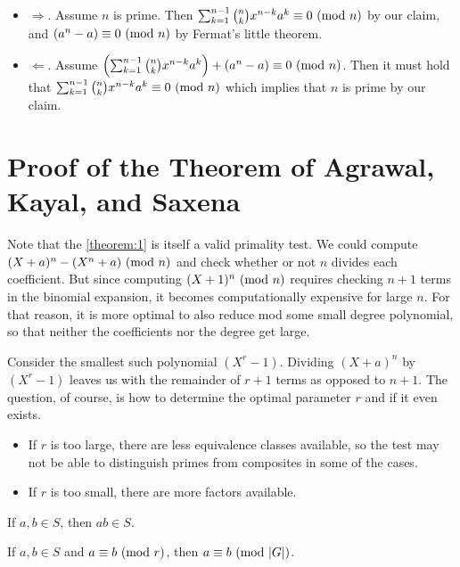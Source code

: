 \begin{itemize}
    \item $\Longrightarrow$. Assume $n$ is prime. Then $\sum_{k=1}^{n-1} \binom{n}{k}x^{n-k}a^k\equiv0\ (\mathrm{mod}\ n)$ by our claim, and $(a^n-a)\equiv 0 \ (\mathrm{mod}\ n)$ by Fermat's little theorem. 
    \item $\Longleftarrow$. Assume $\left(\sum_{k=1}^{n-1} \binom{n}{k}x^{n-k}a^k\right) + (a^n-a)\equiv 0 \ (\mathrm{mod}\ n)$. Then it must hold that $\sum_{k=1}^{n-1} \binom{n}{k}x^{n-k}a^k\equiv 0 \ (\mathrm{mod}\ n)$ which implies that $n$ is prime by our claim.
\end{itemize}

\section{Proof of the Theorem of Agrawal, Kayal, and Saxena}

Note that the \ref{theorem:1} is itself a valid primality test. We could compute $(X + a)^{n} - (X^{n} + a) \ (\mathrm{mod}\ n)$ and check whether or not $n$ divides each coefficient. But since computing $(X + 1)^{n} \ (\mathrm{mod}\ n)$ requires checking $n+1$ terms in the binomial expansion, it becomes computationally expensive for large $n$. For that reason, it is more optimal to also reduce mod some small degree polynomial, so that neither the coefficients nor the degree get large.

Consider the smallest such polynomial $(X^{r} - 1)$. Dividing $(X + a)^{n}$ by $(X^{r} - 1)$ leaves us with the remainder of $r + 1$ terms as opposed to $n + 1$. The question, of course, is how to determine the optimal parameter $r$ and if it even exists.

\begin{itemize}
    \item If $r$ is too large, there are less equivalence classes available, so the test may not be able to distinguish primes from composites in some of the cases.
    \item If $r$ is too small, there are more factors available.
\end{itemize}

\begin{lemma} \label{lemma:4.1}

If $a, b \in S$, then $ab \in S$.

\end{lemma}

\begin{lemma} \label{lemma:4.2}

If $a, b \in S$ and $a \equiv b \ (\mathrm{mod}\ r)$, then $a \equiv b \ (\mathrm{mod}\ |G|)$.

\end{lemma}


